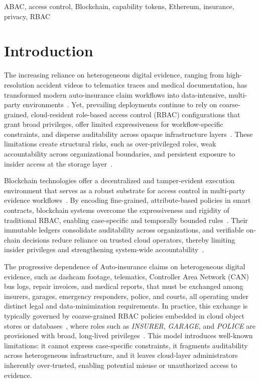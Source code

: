 \documentclass[conference]{IEEEtran}
\begin{document}
\begin{IEEEkeywords}
ABAC, access control, Blockchain, capability tokens, Ethereum, insurance, privacy, RBAC
\end{IEEEkeywords}

\section{Introduction}

The increasing reliance on heterogeneous digital evidence, ranging from high-resolution accident videos to telematics traces and medical documentation, has transformed modern auto-insurance claim workflows into data-intensive, multi-party environments~\cite{OLIVEIRAESA20241165, Ahmad}. Yet, prevailing deployments continue to rely on coarse-grained, cloud-resident role-based access control (RBAC) configurations that grant broad privileges, offer limited expressiveness for workflow-specific constraints, and disperse auditability across opaque infrastructure layers~\cite{app122413036}. These limitations create structural risks, such as over-privileged roles, weak accountability across organizational boundaries, and persistent exposure to insider access at the storage layer~\cite{app122413036}.

Blockchain technologies offer a decentralized and tamper-evident execution environment that serves as a robust substrate for access control in multi-party evidence workflows~\cite{ahakonye2024tides}. By encoding fine-grained, attribute-based policies in smart contracts, blockchain systems overcome the expressiveness and rigidity of traditional RBAC, enabling case-specific and temporally bounded rules~\cite{s23198038}. Their immutable ledgers consolidate auditability across organizations, and verifiable on-chain decisions reduce reliance on trusted cloud operators, thereby limiting insider privileges and strengthening system-wide accountability~\cite{punia2024systematic}.


The progressive dependence of Auto-insurance claims on heterogeneous digital evidence, such as dashcam footage, telematics,  Controller Area Network (CAN) bus logs, repair invoices, and medical reports, that must be exchanged among insurers, garages, emergency responders, police, and courts, all operating under distinct legal and data-minimization requirements. In practice, this exchange is typically governed by coarse-grained RBAC policies embedded in cloud object stores or databases~\cite{raikwar2018insurance, tekale2023claims, thukral2023vehicle}, where roles such as \emph{INSURER}, \emph{GARAGE}, and \emph{POLICE} are provisioned with broad, long-lived privileges~\cite{hombalimath2024vehicleclaim, raghav2024optimizing, alwis2022decentralized}. This model introduces well-known limitations: it cannot express case-specific constraints, it fragments auditability across heterogeneous infrastructure, and it leaves cloud-layer administrators inherently over-trusted, enabling potential misuse or unauthorized access to evidence.
\end{document}
